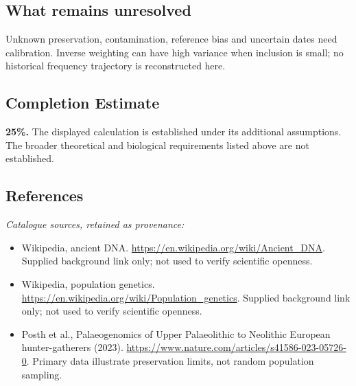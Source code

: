 \documentclass[11pt]{article}
\begin{document}
\subsection{What remains unresolved}
Unknown preservation, contamination, reference bias and uncertain dates need calibration. Inverse weighting can have high variance when inclusion is small; no historical frequency trajectory is reconstructed here.
\subsection{Completion Estimate}
\textbf{25\%.} The displayed calculation is established under its additional assumptions. The broader theoretical and biological requirements listed above are not established.
\subsection{References}
\noindent\emph{Catalogue sources, retained as provenance:}
\begin{itemize}
\item Wikipedia, ancient DNA. \url{https://en.wikipedia.org/wiki/Ancient_DNA}. Supplied background link only; not used to verify scientific openness.
\item Wikipedia, population genetics. \url{https://en.wikipedia.org/wiki/Population_genetics}. Supplied background link only; not used to verify scientific openness.
\item Posth et al., Palaeogenomics of Upper Palaeolithic to Neolithic European hunter-gatherers (2023). \url{https://www.nature.com/articles/s41586-023-05726-0}. Primary data illustrate preservation limits, not random population sampling.
\end{itemize}
\clearpage


\appendix
\end{document}
